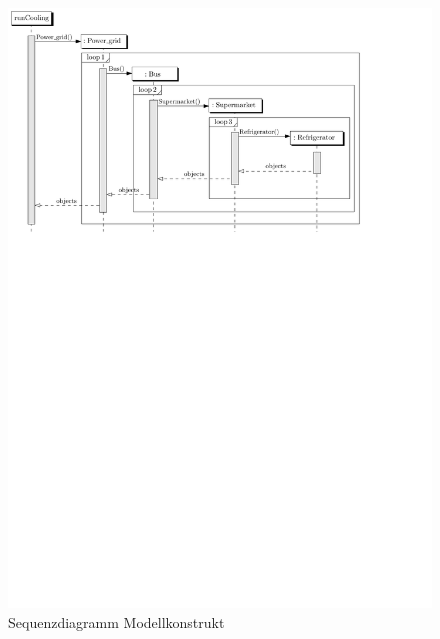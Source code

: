 \begin{figure}[h]
\caption{Sequenzdiagramm Modellkonstrukt}
	\label{uml_sequence}
	\begin{center}
	\includegraphics[scale=0.8]{images/Theorie_Super/sequence_one}
	\end{center}
\end{figure}

